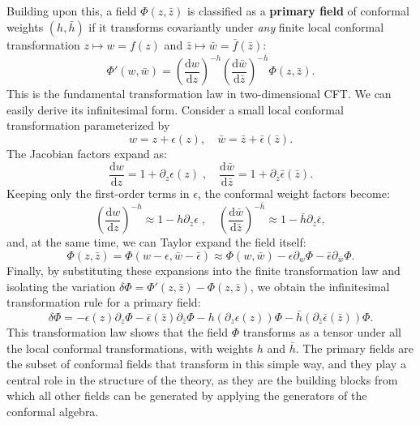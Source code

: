 Building upon this, a field \(\Phi(z, \bar{z})\) is classified as a \textbf{primary field} of conformal weights \((h, \bar{h})\) if it transforms covariantly under \textit{any} finite local conformal transformation \(z \mapsto w = f(z)\) and \(\bar{z} \mapsto \bar{w} = \bar{f}(\bar{z})\):
\begin{equation}
    \Phi'(w, \bar{w}) = \left( \frac{\mathrm{d} w}{\mathrm{d} z} \right)^{-h} \left( \frac{\mathrm{d}\bar{w}}{\mathrm{d}\bar{z}} \right)^{-\bar{h}} \Phi(z, \bar{z}).
    \label{eq:primary_field_transformation}
\end{equation}
This is the fundamental transformation law in two-dimensional CFT. We can easily derive its infinitesimal form. Consider a small local conformal transformation parameterized by
\[
    w = z + \epsilon(z), \quad \bar{w} = \bar{z} + \bar{\epsilon}(\bar{z}).
\]
The Jacobian factors expand as:
\[
    \frac{\mathrm{d} w}{\mathrm{d} z} = 1 + \partial_z \epsilon(z) \;, \quad \frac{\mathrm{d}\bar{w}}{\mathrm{d}\bar{z}} = 1 + \partial_{\bar{z}} \bar{\epsilon}(\bar{z}).
\]
Keeping only the first-order terms in \(\epsilon\), the conformal weight factors become:
\[
    \left( \frac{\mathrm{d} w}{\mathrm{d} z} \right)^{-h} \approx 1 - h \partial_z \epsilon \;, \quad \left( \frac{\mathrm{d}\bar{w}}{\mathrm{d}\bar{z}} \right)^{-\bar{h}} \approx 1 - \bar{h} \partial_{\bar{z}} \bar{\epsilon},
\]
and, at the same time, we can Taylor expand the field itself:
\[
    \Phi(z, \bar{z}) = \Phi(w - \epsilon, \bar{w} - \bar{\epsilon}) \approx \Phi(w, \bar{w}) - \epsilon \partial_w \Phi - \bar{\epsilon} \partial_{\bar{w}} \Phi.
\]
Finally, by substituting these expansions into the finite transformation law and isolating the variation \(\delta \Phi = \Phi'(z, \bar{z}) - \Phi(z, \bar{z})\), we obtain the infinitesimal transformation rule for a primary field:
\begin{equation}
    \delta \Phi = -\epsilon(z) \partial_z \Phi - \bar{\epsilon}(\bar{z}) \partial_{\bar{z}} \Phi - h (\partial_z \epsilon(z)) \Phi - \bar{h} (\partial_{\bar{z}} \bar{\epsilon}(\bar{z})) \Phi.
    \label{eq:primary_field_infinitesimal_transformation}
\end{equation}
This transformation law shows that the field \(\Phi\) transforms as a tensor under all the local conformal transformations, with weights \(h\) and \(\bar{h}\). The primary fields are the subset of conformal fields that transform in this simple way, and they play a central role in the structure of the theory, as they are the building blocks from which all other fields can be generated by applying the generators of the conformal algebra.

